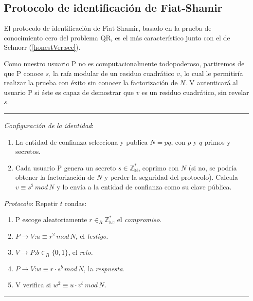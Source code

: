 


\subsection{Protocolo de identificación de Fiat-Shamir}

El protocolo de identificación de Fiat-Shamir, basado en la prueba de conocimiento cero del problema QR, es el más característico junto con el de Schnorr (\autoref{honestVer:sec}).

Como nuestro usuario P no es computacionalmente todopoderoso, partiremos de que P conoce $s$, la raíz modular de un residuo cuadrático $v$, lo cual le permitiría realizar la prueba con éxito sin conocer la factorización de $N$. V autenticará al usuario P si éste es capaz de demostrar que $v$ es un residuo cuadrático, sin revelar $s$.


\rule{\textwidth}{1pt}
\begin{algorithm}
	\hfil
	
	\textit{Configuración de la identidad}:
	\begin{enumerate}
		\item La entidad de confianza selecciona y publica $N=pq$, con $p$ y $q$ primos y secretos.
		
		\item Cada usuario P genera un secreto $s \in \mathbb{Z_N^*}$, coprimo con $N$ (si no, se podría obtener la factorización de $N$ y perder la seguridad del protocolo). Calcula $v \equiv s^2 \, mod \, N$ y lo envía a la entidad de confianza como su clave pública.
		
	\end{enumerate}
	
	
	\textit{Protocolo}: Repetir $t$ rondas:
	\begin{enumerate}
		\item P escoge aleatoriamente $r \in_R \mathbb{Z_N^*}$, el \textit{compromiso}.
		\item $P \rightarrow V$:\quad $u \equiv r^2 \, mod \, N$, el \textit{testigo}.
		\item $V \rightarrow P$:\quad $b \in_R \{0,1\}$, el \textit{reto}.
		\item $P \rightarrow V$:\quad $w \equiv r\cdot s^b \, mod \, N$, la \textit{respuesta}.
		\item V verifica si \quad $ w^2 \equiv u\cdot v^b \, mod \, N$.
	\end{enumerate}
	
\end{algorithm}
\rule{\textwidth}{1pt}

